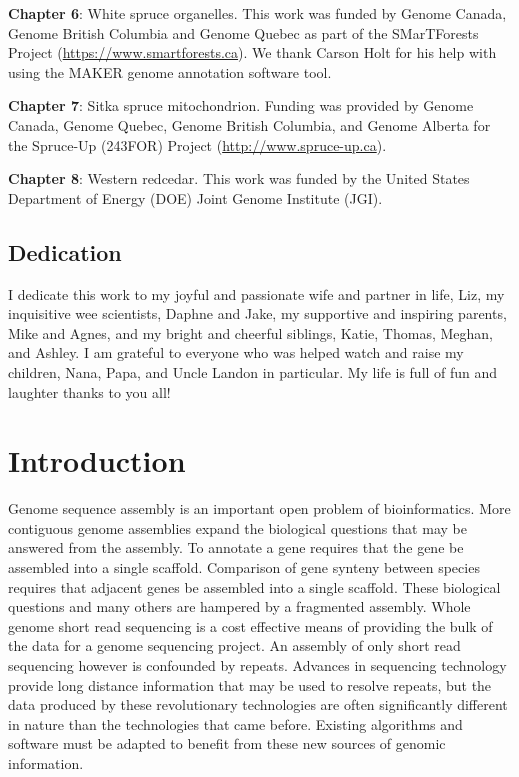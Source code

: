 \documentclass[
  12pt,
  oneside,
  openany]{book}
\begin{document}
\textbf{Chapter 6}: White spruce organelles. This work was funded by Genome Canada, Genome British Columbia and Genome Quebec as part of the SMarTForests Project (\url{https://www.smartforests.ca}). We thank Carson Holt for his help with using the MAKER genome annotation software tool.

\textbf{Chapter 7}: Sitka spruce mitochondrion. Funding was provided by Genome Canada, Genome Quebec, Genome British Columbia, and Genome Alberta for the Spruce-Up (243FOR) Project (\url{http://www.spruce-up.ca}).

\textbf{Chapter 8}: Western redcedar. This work was funded by the United States Department of Energy (DOE) Joint Genome Institute (JGI).

\newpage

\hypertarget{dedication}{%
\section*{Dedication}\label{dedication}}

I dedicate this work to my joyful and passionate wife and partner in life, Liz, my inquisitive wee scientists, Daphne and Jake, my supportive and inspiring parents, Mike and Agnes, and my bright and cheerful siblings, Katie, Thomas, Meghan, and Ashley. I am grateful to everyone who was helped watch and raise my children, Nana, Papa, and Uncle Landon in particular. My life is full of fun and laughter thanks to you all!

\mainmatter

\hypertarget{introduction}{%
\chapter{Introduction}\label{introduction}}

Genome sequence assembly is an important open problem of bioinformatics. More contiguous genome assemblies expand the biological questions that may be answered from the assembly. To annotate a gene requires that the gene be assembled into a single scaffold. Comparison of gene synteny between species requires that adjacent genes be assembled into a single scaffold. These biological questions and many others are hampered by a fragmented assembly. Whole genome short read sequencing is a cost effective means of providing the bulk of the data for a genome sequencing project. An assembly of only short read sequencing however is confounded by repeats. Advances in sequencing technology provide long distance information that may be used to resolve repeats, but the data produced by these revolutionary technologies are often significantly different in nature than the technologies that came before. Existing algorithms and software must be adapted to benefit from these new sources of genomic information.
\end{document}
